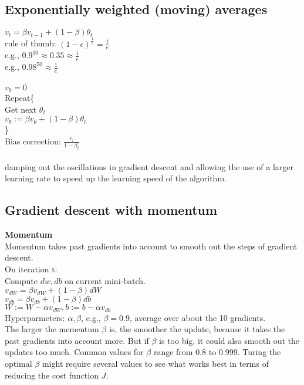 \subsection{Exponentially weighted (moving) averages}
$v_t = \beta v_{t-1} + (1-\beta)\theta_t$\\
rule of thumb: $(1-\epsilon)^{\frac{1}{\epsilon}} = \frac{1}{e}$\\
e.g., $0.9^{10} \approx 0.35 \approx \frac{1}{e}$\\
e.g., $0.98^{50} \approx \frac{1}{e}$\\
\\
$v_{\theta} = 0$\\
Repeat\{\\
\indent Get next $\theta_t$\\
\indent $v_{\theta} := \beta v_{\theta} + (1-\beta)\theta_t$\\
\}
\\
Bias correction: $\displaystyle\frac{v_t}{1-\beta_t}$\\
\\
damping out the oscillations in gradient descent and allowing the use of a larger learning rate to speed up the learning speed of the algorithm.

%
\subsection{Gradient descent with momentum}
\textbf{Momentum}\\
Momentum takes past gradients into account to smooth out the steps of gradient descent.
\\
On iteration t:\\
\indent Compute $dw, db$ on current mini-batch.\\
\indent $\displaystyle v_{dW} = \beta v_{dW} + (1-\beta)dW$\\
\indent $\displaystyle v_{db} = \beta v_{db} + (1-\beta)db$\\
\indent $\displaystyle W := W-\alpha v_{dW}, b := b - \alpha v_{db}$\\
Hyperparmeters: $\alpha, \beta$, e.g., $\beta = 0.9$, average over about the 10 gradients.\\
The larger the mementum $\beta$ is, the smoother the update, because it takes the past gradients into account more. But if $\beta$ is too big, it could also smooth out the updates too much. Common values for $\beta$ range from 0.8 to 0.999. Turing the optimal $\beta$ might require several values to see what works best in terms of reducing the cost function $J$.


